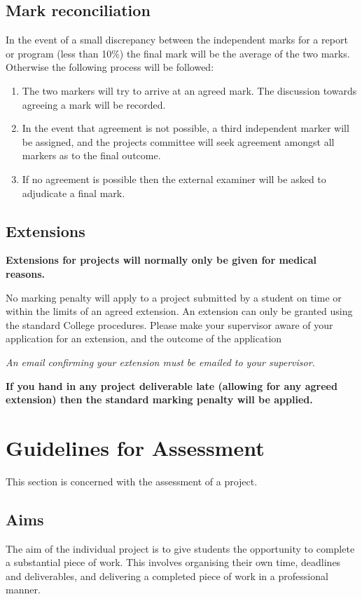 \documentclass[11pt]{article}
\begin{document}
\subsection*{Mark reconciliation}
In the event of a small discrepancy between the independent marks for a report or program (less than 10\%) the final mark will be the average of the two marks.  Otherwise the following process will be followed:

\begin{enumerate}
\item  The two markers will try to arrive at an agreed mark.  The discussion towards agreeing a mark will be recorded.
\item  In the event that agreement is not possible, a third independent marker will be assigned, and the projects committee will seek agreement amongst all markers as to the final outcome.
\item If no agreement is possible then the external examiner will be asked to adjudicate a final mark.
\end{enumerate}

\subsection*{Extensions}
\label{sec:extensions}
\textbf{Extensions for projects will normally only be given for medical reasons.}

No marking penalty will apply to a project submitted by a student on time or within the limits of an agreed extension.  An extension can only be granted using the standard College procedures.  Please make your supervisor aware of your application for an extension, and the outcome of the application

\vspace*{1cm}
\emph{An email confirming your extension must be emailed to your  supervisor.}

\vspace*{1cm}
\textbf{If you hand in any project deliverable late (allowing for any agreed extension) then the standard marking penalty will be applied.}


\newpage
\section{Guidelines for Assessment}

This section is concerned with the assessment of a project.

\subsection*{Aims}
The {aim} of the individual project is to give students the opportunity to complete a substantial piece of work.  This involves organising their own time, deadlines and deliverables, and delivering a completed piece of work in a professional manner.
\end{document}
